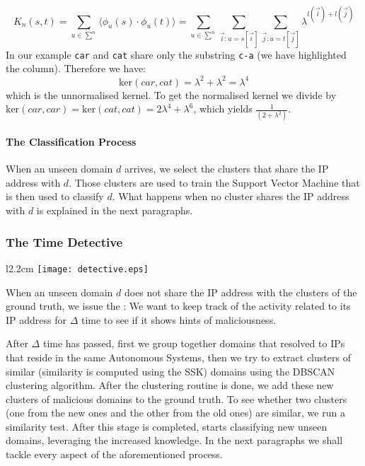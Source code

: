 \[ %
    K_n(s,t) = \sum_{u \in \sum^n} \langle \phi_u(s) \cdot \phi_u(t) \rangle %
             = \sum_{u \in \sum^n} \sum_{\vec{i}:u=s[\vec{i}]} \sum_{\vec{j}:u=t[\vec{j}]} %
                \lambda^{l(\vec{i})+l(\vec{j})} %
\]
In our example \texttt{car} and \texttt{cat} share only the substring \texttt{c-a}
(we have highlighted the column). Therefore we have:
\[ \text{ker}(car,cat) = \lambda^2 + \lambda^2 = \lambda^4 \]
which is the unnormalised kernel. To get the normalised kernel we divide by
$\text{ker}(car,car) = \text{ker}(cat,cat) = 2\lambda^4 + \lambda^6$, which
yields $\frac{1}{(2 + \lambda^2)}$.

\paragraph{The Classification Process} %
\label{par:the_classification_process}
When an unseen domain $d$ arrives, we select the clusters that share the IP address with $d$.
Those clusters are used to train the Support Vector Machine that is then used to classify
$d$. What happens when no cluster shares the IP address with $d$ is explained in the
next paragraphs.

\subsubsection{The Time Detective} %
\label{ssub:the_time_detective}
\begin{wrapfigure}{l}{2.2cm}
\centering
    \texttt{[image: detective.eps]}
\end{wrapfigure}
When an unseen domain $d$ does not share the IP address with the clusters of the ground
truth, we issue the
: We want to keep track of the activity related to its IP address for $\Delta$ time to see if it shows hints of maliciousness.

After
$\Delta$ time has passed, first we group together domains that resolved to IPs that
reside in the same Autonomous Systems, then we try to extract clusters of similar (similarity is computed using the SSK) domains using the DBSCAN
clustering algorithm. After the clustering routine is done, we add these new clusters of malicious domains to the ground truth. To see whether two clusters (one from the new ones and the
other from the old ones) are similar, we run a similarity test. After this
stage is completed, \thesystem starts classifying new unseen domains, leveraging
the increased knowledge.
In the next paragraphs we shall tackle every aspect of the aforementioned process.

